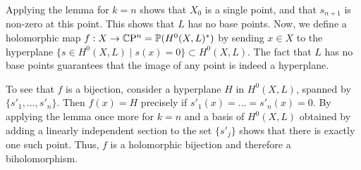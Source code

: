 \begin{myproof}
	Applying the lemma for $k=n$ shows that $X_0$ is a single point, and that $s_{n+1}$ is non-zero at this point. This shows that $L$ has no base points. Now, we define a holomorphic map $f:X\to \mathbb{C}\mathrm{P}^n=\mathbb{P}(H^0(X,L)^*)$ by sending $x\in X$ to the hyperplane $\{s\in H^0(X,L)\mid s(x)=0\}\subset H^0(X,L)$. The fact that $L$ has no base points guarantees that the image of any point is indeed a hyperplane.
	
	To see that $f$ is a bijection, consider a hyperplane $H$ in $H^0(X,L)$, spanned by $\{s'_1,\dots,s'_n\}$. Then $f(x)=H$ precisely if $s'_1(x)=\dots =s'_n(x)=0$. By applying the lemma once more for $k=n$ and a basis of $H^0(X,L)$ obtained by adding a linearly independent section to the set $\{s'_j\}$ shows that there is exactly one such point. Thus, $f$ is a holomorphic bijection and therefore a biholomorphism. 
\end{myproof}

